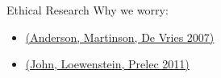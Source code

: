 \documentclass{beamer}
\begin{document}


\begin{frame}{Ethical Research}
Why we worry:
\begin{itemize}[<.->]
\item \href{http://www.jstor.org/stable/pdf/10.1525/jer.2007.2.4.3.pdf}{(Anderson, Martinson, De Vries 2007)}
\item \href{http://pss.sagepub.com/content/23/5/524}{(John, Loewenstein, Prelec 2011)}
\end{itemize}
\end{frame}
\end{document}
